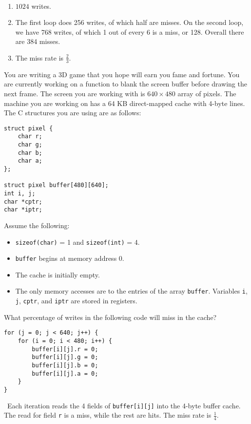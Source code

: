 \documentclass[12pt]{article}
\newenvironment{ex}[2][Exercise]{\begin{trivlist}
		\item[\hskip \labelsep {\bfseries #1}\hskip \labelsep {\bfseries #2.}]}{\end{trivlist}}
\newenvironment{sol}[1][Solution]{\begin{trivlist}
		\item[\hskip \labelsep {\bfseries #1:}]}{\end{trivlist}}
\begin{document}
\begin{sol}
	\
	\begin{enumerate}[label=(\alph*)]
		\item $1024$ writes.
		\item The first loop does 256 writes, of which half are misses. On the second loop, we have
		768 writes, of which 1 out of every 6 is a miss, or 128. Overall there are 384 misses.
		\item The miss rate is $\frac{2}{3}$.
	\end{enumerate}
\end{sol}

\begin{ex}{6.41}
	You are writing a 3D game that you hope will earn you fame and fortune. You are currently working on a
	function to blank the screen buffer before drawing the next frame. The screen you are working with is
	 $640\times 480$ array of pixels. The machine you are working on has a 64 KB direct-mapped cache with
	 4-byte lines. The C structures you are using are as follows:
	 \begin{lstlisting}
struct pixel {
	char r;
	char g;
	char b;
	char a;	
};

struct pixel buffer[480][640];
int i, j;
char *cptr;
char *iptr;
	 \end{lstlisting}
 	Assume the following:
 	\begin{itemize}
 		\item \texttt{sizeof(char)} = 1 and \texttt{sizeof(int)} = 4.
 		\item \texttt{buffer} begins at memory address 0.
 		\item The cache is initially empty.
 		\item The only memory accesses are to the entries of the array \texttt{buffer}. Variables \texttt{i},
 		\texttt{j}, \texttt{cptr}, and \texttt{iptr} are stored in registers.
 	\end{itemize}
 	What percentage of writes in the following code will miss in the cache?
 	\begin{lstlisting}
for (j = 0; j < 640; j++) {
	for (i = 0; i < 480; i++) {
		buffer[i][j].r = 0;
		buffer[i][j].g = 0;
		buffer[i][j].b = 0;
		buffer[i][j].a = 0;
	} 
}
 	\end{lstlisting}
\end{ex}

\begin{sol}
	\
	Each iteration reads the 4 fields of \texttt{buffer[i][j]} into the 4-byte buffer cache. The
	read for field \texttt{r} is a miss, while the rest are hits. The miss rate is $\frac{1}{4}$.
\end{sol}
\end{document}
